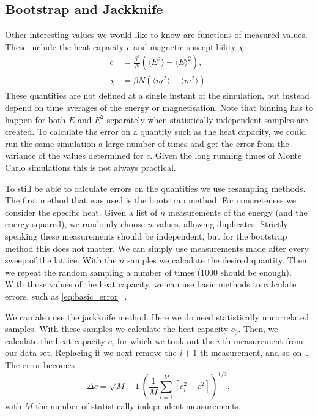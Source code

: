 \documentclass[11pt, a4paper]{report} %
\begin{document}
\subsection{Bootstrap and Jackknife}
Other interesting values we would like to know are functions of measured values.
These include the heat capacity \(c\) and magnetic susceptibility \(\chi\):
\begin{align}
	c &= \frac{\beta^2}{N} \left(\langle E^2 \rangle - \langle E \rangle^2 \right), \\
	\chi &= \beta N \left( \langle m^2 \rangle - \langle m^2 \rangle \right).
\end{align}
These quantities are not defined at a single instant of the simulation, but instead depend on time averages of the energy or magnetisation.
Note that binning has to happen for both \(E\) and \(E^2\) separately when statistically independent samples are created.
To calculate the error on a quantity such as the heat capacity, we could run the same simulation a large number of times and get the error from the variance of the values determined for \(c\).
Given the long running times of Monte Carlo simulations this is not always practical.

To still be able to calculate errors on the quantities we use resampling methods.
The first method that was used is the bootstrap method.
For concreteness we consider the specific heat.
Given a list of \(n\) measurements of the energy (and the energy squared), we randomly choose \(n\) values, allowing duplicates.
Strictly speaking these measurements should be independent, but for the bootstrap method this does not matter.
We can simply use measurements made after every sweep of the lattice.
With the \(n\) samples we calculate the desired quantity.
Then we repeat the random sampling a number of times (1000 should be enough).
With those values of the heat capacity, we can use basic methods to calculate errors, such as \cref{eq:basic_error}~\cite{newman:1999}.

We can also use the jackknife method.
Here we do need statistically uncorrelated samples.
With these samples we calculate the heat capacity \(c_0\).
Then, we calculate the heat capacity \(c_i\) for which we took out the \(i\)-th measurement from our data set.
Replacing it we next remove the \(i+1\)-th measurement, and so on~\cite{newman:1999}.
The error becomes~\cite{corboz}
\begin{equation}
	\Delta c = \sqrt{M-1}\left( \frac{1}{M} \sum_{i=1}^M \left[c_i^2 - c^2\right] \right)^{1/2},
\end{equation}
with \(M\) the number of statistically independent measurements.
\end{document}
